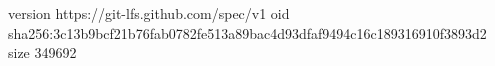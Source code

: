 version https://git-lfs.github.com/spec/v1
oid sha256:3c13b9bcf21b76fab0782fe513a89bac4d93dfaf9494c16c189316910f3893d2
size 349692
